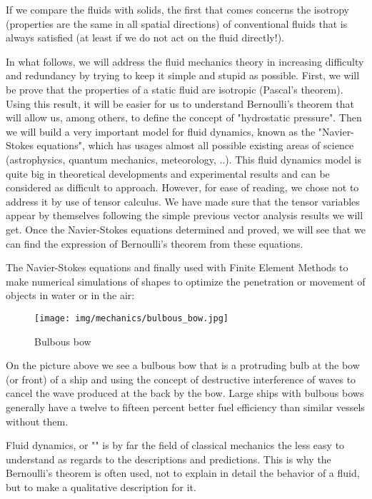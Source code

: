 	If we compare the fluids with solids, the first that comes concerns the isotropy (properties are the same in all spatial directions) of conventional fluids that is always satisfied (at least if we do not act on the fluid directly!).
	
	In what follows, we will address the fluid mechanics theory in increasing difficulty and redundancy by trying to keep it simple and stupid as possible. First, we will be prove that the properties of a static fluid are isotropic (Pascal's theorem). Using this result, it will be easier for us to understand Bernoulli's theorem that will allow us, among others, to define the concept of "hydrostatic pressure". Then we will build a very important model for fluid dynamics, known as the "Navier-Stokes equations", which has usages almost all possible existing areas of science (astrophysics, quantum mechanics, meteorology, ..). This fluid dynamics model is quite big in theoretical developments and experimental results and can be considered as difficult to approach. However, for ease of reading, we chose not to address it by use of tensor calculus. We have made sure that the tensor  variables appear  by themselves following the simple previous vector analysis results we will get. Once the Navier-Stokes equations determined and proved, we will see that we can find the expression of Bernoulli's theorem from these equations.
	
	The Navier-Stokes equations and finally used with Finite Element Methods to make numerical simulations of shapes to optimize the penetration or movement of objects in water or in the air:
	\begin{figure}[H]
		\centering
		\texttt{[image: img/mechanics/bulbous\_bow.jpg]}
		\caption[]{Bulbous bow}
	\end{figure}
	On the picture above we see a bulbous bow that is a protruding bulb at the bow (or front) of a ship and using the concept of destructive interference of waves to cancel the wave produced at the back by the bow. Large ships with bulbous bows generally have a twelve to fifteen percent better fuel efficiency than similar vessels without them.
	
	Fluid dynamics, or "" is by far the field of classical mechanics the less easy to understand as regards to the descriptions and predictions. This is why the Bernoulli's theorem is often used, not to explain in detail the behavior of a fluid, but to make a qualitative description for it.
	
